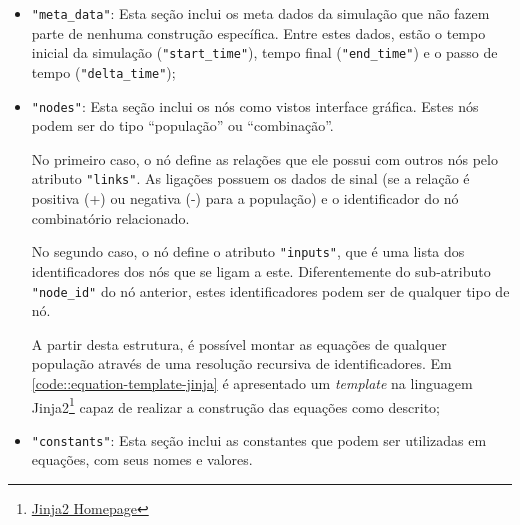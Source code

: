 \documentclass[
	12pt,				%
	openright,			%
	oneside,			%
	a4paper,			%
	main=brazil,
	english,			%
	]{ufsj-abntex2}
\begin{document}
\begin{itemize}
    \item \texttt{"meta\_data"}: Esta seção inclui os meta dados da simulação que não fazem parte de nenhuma construção específica. Entre estes dados, estão o tempo inicial da simulação (\texttt{"start\_time"}), tempo final (\texttt{"end\_time"}) e o passo de tempo (\texttt{"delta\_time"});

    \item \texttt{"nodes"}: Esta seção inclui os nós como vistos interface gráfica. Estes nós podem ser do tipo ``população'' ou ``combinação''.
    
    No primeiro caso, o nó define as relações que ele possui com outros nós pelo atributo \texttt{"links"}. As ligações possuem os dados de sinal (se a relação é positiva (+) ou negativa (-) para a população) e o identificador do nó combinatório relacionado.

    No segundo caso, o nó define o atributo \texttt{"inputs"}, que é uma lista dos identificadores dos nós que se ligam a este. Diferentemente do sub-atributo \texttt{"node\_id"} do nó anterior, estes identificadores podem ser de qualquer tipo de nó.

    A partir desta estrutura, é possível montar as equações de qualquer população através de uma resolução recursiva de identificadores. Em \ref{code::equation-template-jinja} é apresentado um \textit{template} na linguagem Jinja2\footnote{\href{https://jinja.palletsprojects.com/en/3.1.x/}{Jinja2 Homepage}} capaz de realizar a construção das equações como descrito;

    \item \texttt{"constants"}: Esta seção inclui as constantes que podem ser utilizadas em equações, com seus nomes e valores.
\end{itemize}


\end{document}

